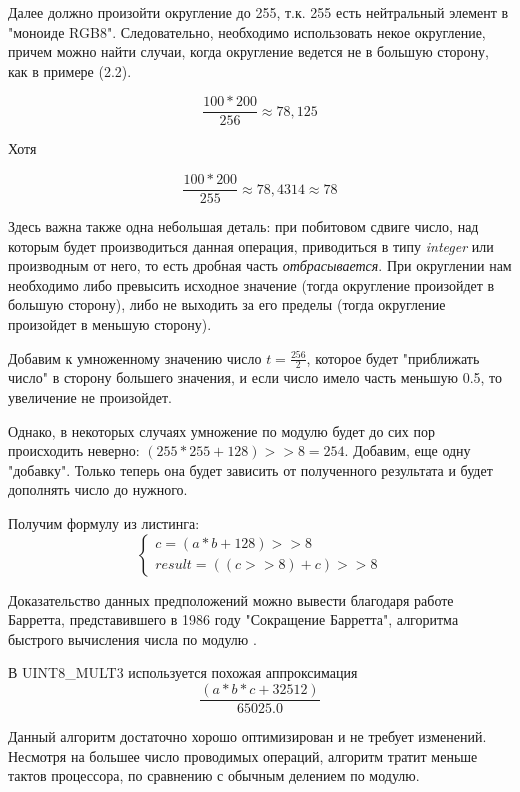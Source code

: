 Далее должно произойти округление до 255, т.к. 255 есть нейтральный элемент в "моноиде RGB8".
Следовательно, необходимо использовать некое округление, причем можно найти случаи, когда округление ведется не в большую сторону, как в примере (2.2).

\begin{equation}
\frac{100*200}{256} \approx 78,125
\end{equation}

Хотя 

\begin{equation}
\frac{100*200}{255} \approx 78,4314 \approx 78
\end{equation}

Здесь важна также одна небольшая деталь: при побитовом сдвиге число, над которым будет производиться данная операция, приводиться в типу \textit{integer} или производным от него, то есть дробная часть \textit{отбрасывается}. При округлении нам необходимо либо превысить исходное значение (тогда округление произойдет в большую сторону), либо не выходить за его пределы (тогда округление произойдет в меньшую сторону). 

Добавим к умноженному значению число $t = \frac{256}{2}$, которое будет "приближать число" в сторону большего значения, и если число имело часть меньшую 0.5, то увеличение не произойдет.

Однако, в некоторых случаях умножение по модулю будет до сих пор происходить неверно: $(255*255+128) >> 8 = 254$. Добавим, еще одну "добавку". Только теперь она будет зависить от полученного результата и будет дополнять число до нужного.

Получим формулу из листинга: 
\begin{equation}
\begin{cases} 
c = (a * b + 128) >> 8 \\
result = ((c >> 8) + c) >> 8
\end{cases}
\end{equation}

Доказательство данных  предположений можно вывести благодаря работе Барретта, представившего в 1986 году  "Сокращение Барретта", алгоритма быстрого вычисления числа по модулю \cite{bib7}.

В  UINT8\_MULT3 используется похожая аппроксимация 
\begin{equation}
\frac{(a * b * c + 32512)}{65025.0}
\end{equation}

Данный алгоритм достаточно хорошо оптимизирован и не требует изменений. Несмотря на большее число проводимых операций, алгоритм тратит меньше тактов процессора, по сравнению с обычным делением по модулю.

